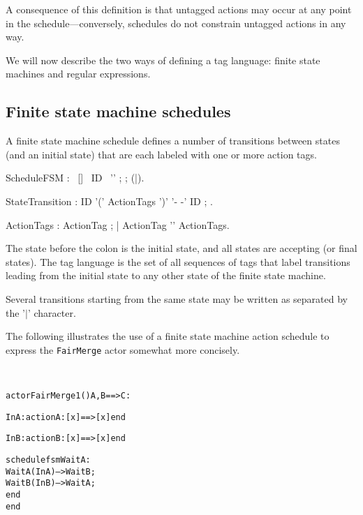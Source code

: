 A consequence of this definition is that untagged actions may occur at
any point in the schedule---conversely, schedules do not constrain
untagged actions in any way.

We will now describe the two ways of defining a tag language: finite
state machines and regular expressions.


\subsection{Finite state machine schedules}\label{sect:FSMSchedules}


A finite state machine schedule defines a number of transitions
between states (and an initial state) that are each labeled with one
or more action tags.

\bgr
  ScheduleFSM : \kwSchedule ~[\kwFSM] ~ID ~'\charColon' ;
       ;
      (\kwEnd|\kwEndSchedule).

  StateTransition : ID '(' ActionTags ')' '- -\charMore' ID ;
      .

  ActionTags : ActionTag ;
      | ActionTag '\charComma' ActionTags.
\egr

The state before the colon is the initial state, and all states are
accepting (or final states). The tag language is the set of all
sequences of tags that label transitions leading from the initial
state to any other state of the finite state machine.

Several transitions starting from the same state may be written as
separated by the '$\mid$' character.

The following illustrates the use of a finite state machine action
schedule to express the {\tt FairMerge} actor somewhat more concisely.

\begin{example}\ 
\begin{alltt}
actor FairMerge1 () A, B ==> C :

  InA: action A: [x] ==> [x] end

  InB: action B: [x] ==> [x] end

  schedule fsm WaitA :
    WaitA (InA) --> WaitB;
    WaitB (InB) --> WaitA;
  end
end
\end{alltt}
\end{example}

